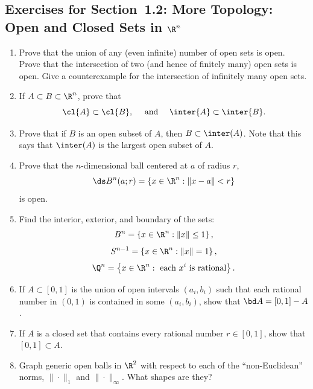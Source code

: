 \documentclass[11pt, a4paper, parskip=full]{scrartcl}
\begin{document}
\subsection*{Exercises for Section~1.2: More Topology: Open and Closed Sets in
$\R^n$}
\begin{enumerate}
\item\label{topology}	Prove that the union of any (even infinite) number of open sets is open.
 Prove that the intersection of two (and hence of finitely many) open sets is
 open.  Give a counterexample for the intersection of infinitely many open sets.

\item\label{clAB}If $A\subset B\subset\R^n$, prove that
	$$\cl{A}\subset\cl{B},\quad\mbox{ and }\quad\inter{A}\subset\inter{B}.$$

\item	Prove that if $B$ is an open subset of $A$, then $B\subset \inter(A)$.  Note that this says that $\inter(A)$ is the largest open subset of $A$.

\item	\label{openset}Prove that the $n$-dimensional ball centered at $a$ of radius $r$,
	$$\ds B^n(a;r) = \left\{x\in\R^n:\|x-a\|< r\right\}$$ is open.

\item	Find the interior, exterior, and boundary of the sets:
	$$B^n = \left\{x\in\R^n : \|x\| \leq 1\right\},$$
	$$S^{n-1} = \left\{x\in\R^n : \|x\| = 1\right\},$$
	$$\Q^n = \left\{x\in\R^n : \mbox{ each } x^i\mbox{ is rational}\right\}.$$
\begin{soln}
\end{soln}


\item	If $A\subset[0,1]$ is the union of open intervals $(a_i,b_i)$ such that
each rational number in $(0,1)$ is contained in some $(a_i,b_i)$, show that
$\bd A = [0,1] - A$.

\item	If $A$ is a closed set that contains every rational number $r\in[0,1]$,
show that $[0,1]\subset A$.

\item	Graph generic open balls in $\R^2$ with respect to each of the ``non-Euclidean'' norms, $\|\cdot\|_1$ and $\|\cdot\|_\infty$.
What shapes are they?
\begin{soln}
\end{soln}

\end{enumerate}
\end{document}
